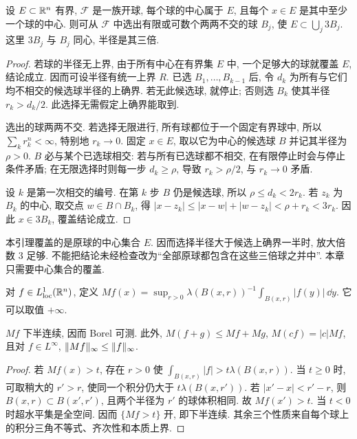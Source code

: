 
\begin{lemma}\label{ra:c8:vitali}
设 $E\subset\mathbb R^n$ 有界, $\mathcal F$ 是一族开球, 每个球的中心属于 $E$, 且每个 $x\in E$ 是其中至少一个球的中心. 则可从 $\mathcal F$ 中选出有限或可数个两两不交的球 $B_j$, 使 $E\subset\bigcup_j3B_j$. 这里 $3B_j$ 与 $B_j$ 同心, 半径是其三倍.
\end{lemma}
\begin{proof}
若球的半径无上界, 由于所有中心在有界集 $E$ 中, 一个足够大的球就覆盖 $E$, 结论成立. 因而可设半径有统一上界 $R$. 已选 $B_1,\ldots,B_{k-1}$ 后, 令 $d_k$ 为所有与它们均不相交的候选球半径的上确界. 若无此候选球, 就停止; 否则选 $B_k$ 使其半径 $r_k>d_k/2$. 此选择无需假定上确界能取到.

选出的球两两不交. 若选择无限进行, 所有球都位于一个固定有界球中, 所以 $\sum_kr_k^n<\infty$, 特别地 $r_k\to0$.
固定 $x\in E$, 取以它为中心的候选球 $B$ 并记其半径为 $\rho>0$. $B$ 必与某个已选球相交: 若与所有已选球都不相交, 在有限停止时会与停止条件矛盾; 在无限选择时则每一步 $d_k\ge\rho$, 导致 $r_k>\rho/2$, 与 $r_k\to0$ 矛盾.

设 $k$ 是第一次相交的编号. 在第 $k$ 步 $B$ 仍是候选球, 所以 $\rho\le d_k<2r_k$. 若 $z_k$ 为 $B_k$ 的中心, 取交点 $w\in B\cap B_k$, 得
$|x-z_k|\le|x-w|+|w-z_k|<\rho+r_k<3r_k$.
因此 $x\in3B_k$, 覆盖结论成立.
\end{proof}

\begin{remark}
本引理覆盖的是原球的中心集合 $E$. 因而选择半径大于候选上确界一半时, 放大倍数 $3$ 足够. 不能把结论未经检查改为“全部原球都包含在这些三倍球之并中”. 本章只需要中心集合的覆盖.
\end{remark}

\begin{definition}
对 $f\in L^1_{\mathrm{loc}}(\mathbb R^n)$, 定义
$Mf(x)=\sup_{r>0}\lambda(B(x,r))^{-1}\int_{B(x,r)}|f(y)|\,\dd y$.
它可以取值 $+\infty$.
\end{definition}

\begin{proposition}\label{ra:c8:max-meas}
$Mf$ 下半连续, 因而 Borel 可测. 此外, $M(f+g)\le Mf+Mg$, $M(cf)=|c|Mf$, 且对 $f\in L^\infty$, $\lVert Mf\rVert_\infty\le\lVert f\rVert_\infty$.
\end{proposition}
\begin{proof}
若 $Mf(x)>t$, 存在 $r>0$ 使 $\int_{B(x,r)}|f|>t\lambda(B(x,r))$. 当 $t\ge0$ 时, 可取稍大的 $r'>r$, 使同一个积分仍大于 $t\lambda(B(x,r'))$. 若 $|x'-x|<r'-r$, 则 $B(x,r)\subset B(x',r')$, 且两个半径为 $r'$ 的球体积相同. 故 $Mf(x')>t$. 当 $t<0$ 时超水平集是全空间. 因而 $\{Mf>t\}$ 开, 即下半连续. 其余三个性质来自每个球上的积分三角不等式、齐次性和本质上界.
\end{proof}

